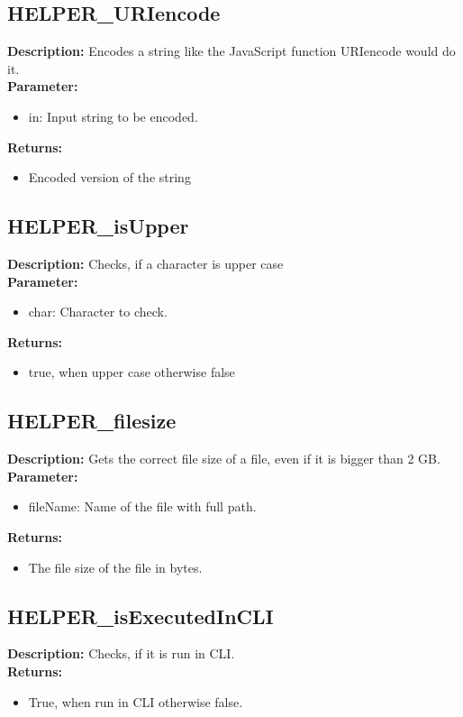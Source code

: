 \subsection{HELPER\_URIencode}
\textbf{Description:} Encodes a string like the JavaScript function URIencode would do it.\\
\textbf{Parameter:}
\begin{itemize}
\item in: Input string to be encoded.
\end{itemize}
\textbf{Returns:}
\begin{itemize}
\item Encoded version of the string
\end{itemize}

\subsection{HELPER\_isUpper}
\textbf{Description:} Checks, if a character is upper case\\
\textbf{Parameter:}
\begin{itemize}
\item char: Character to check.
\end{itemize}
\textbf{Returns:}
\begin{itemize}
\item true, when upper case otherwise false
\end{itemize}

\subsection{HELPER\_filesize}
\textbf{Description:} Gets the correct file size of a file, even if it is bigger than 2 GB.\\
\textbf{Parameter:}
\begin{itemize}
\item fileName: Name of the file with full path.
\end{itemize}
\textbf{Returns:}
\begin{itemize}
\item The file size of the file in bytes.
\end{itemize}

\subsection{HELPER\_isExecutedInCLI}
\textbf{Description:} Checks, if it is run in CLI.\\
\textbf{Returns:}
\begin{itemize}
\item True, when run in CLI otherwise false.
\end{itemize}


